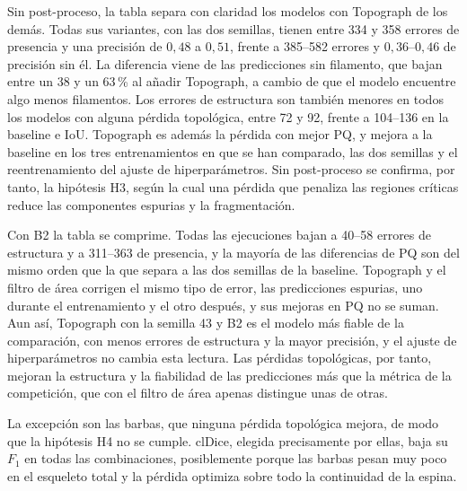 Sin post-proceso, la tabla separa con claridad los modelos con
Topograph de los demás. Todas sus variantes, con las dos semillas, tienen
entre 334 y 358 errores de presencia y una precisión de $0{,}48$ a
$0{,}51$, frente a 385--582 errores y $0{,}36$--$0{,}46$ de precisión sin
él. La diferencia viene de las predicciones sin filamento, que bajan
entre un 38 y un 63\,\% al añadir Topograph, a cambio de que el modelo
encuentre algo menos filamentos. Los errores de estructura son también
menores en todos los modelos con alguna pérdida topológica, entre 72 y
92, frente a 104--136 en la baseline e IoU. Topograph es además la pérdida
con mejor PQ, y mejora a la baseline en los tres entrenamientos en que
se han comparado, las dos semillas y el reentrenamiento del ajuste de
hiperparámetros. Sin post-proceso se confirma, por tanto, la hipótesis
H3, según la cual una pérdida que penaliza las regiones críticas reduce
las componentes espurias y la fragmentación.

Con B2 la tabla se comprime. Todas las ejecuciones bajan a 40--58
errores de estructura y a 311--363 de presencia, y la mayoría de las
diferencias de PQ son del mismo orden que la que separa a las dos
semillas de la baseline. Topograph y el filtro de área corrigen el mismo
tipo de error, las predicciones espurias, uno durante el entrenamiento y
el otro después, y sus mejoras en PQ no se suman. Aun así, Topograph con
la semilla 43 y B2 es el modelo más fiable de la comparación, con menos
errores de estructura y la mayor precisión, y el ajuste de
hiperparámetros no cambia esta lectura. Las pérdidas topológicas, por
tanto, mejoran la estructura y la fiabilidad de las predicciones más que
la métrica de la competición, que con el filtro de área apenas distingue
unas de otras.

La excepción son las barbas, que ninguna pérdida topológica mejora, de
modo que la hipótesis H4 no se cumple. clDice, elegida precisamente por
ellas, baja su $F_1$ en todas las combinaciones, posiblemente porque las
barbas pesan muy poco en el esqueleto total y la pérdida optimiza sobre
todo la continuidad de la espina.

